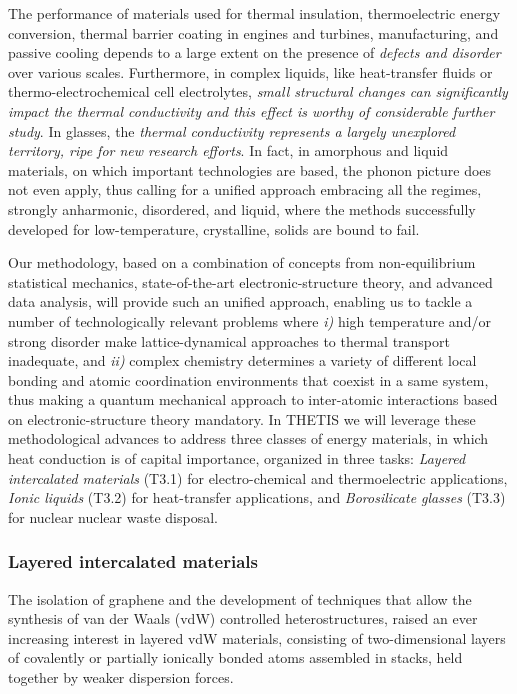 The performance of materials used for thermal insulation, thermoelectric energy conversion, thermal barrier coating in engines and turbines, manufacturing, and passive cooling depends to a large extent on the presence of \textit{defects and disorder} over various scales. Furthermore, in complex liquids, like heat-transfer fluids or thermo-electrochemical cell electrolytes, \textit{small structural changes can significantly impact the thermal conductivity and this effect is worthy of considerable further study}.\cite{MacFarlane:2014hj} In glasses, the \textit{thermal conductivity represents a largely unexplored territory, ripe for new research efforts}.\cite{MauroFM14} In fact, in amorphous and liquid materials, on which important technologies are based, the phonon picture does not even apply, thus calling for a unified approach embracing all the regimes, strongly anharmonic, disordered, and liquid, where the methods successfully developed for low-temperature, crystalline, solids are bound to fail.

Our methodology, based on a combination of concepts from non-equilibrium statistical mechanics, state-of-the-art electronic-structure theory, and advanced data analysis, will provide such an unified approach, enabling us to tackle a number of technologically relevant problems where \emph{i)} high temperature and/or strong disorder make lattice-dynamical approaches to thermal transport inadequate, and \emph{ii)} complex chemistry determines a variety of different local bonding and atomic coordination environments that coexist in a same system, thus making a quantum mechanical approach to inter-atomic interactions based on electronic-structure theory mandatory. In THETIS we will leverage these methodological advances to address three classes of energy materials, in which heat conduction is of capital importance, organized in three tasks: \emph{Layered intercalated materials} (T3.1) for electro-chemical and thermoelectric applications, \emph{Ionic liquids} (T3.2) for heat-transfer applications, and \emph{Borosilicate glasses} (T3.3) for nuclear nuclear waste disposal. 

\subsubsection{Layered intercalated materials}
The isolation of graphene and the development of techniques that allow the synthesis of van der Waals (vdW) controlled heterostructures, raised an ever increasing interest in layered vdW materials, consisting of two-dimensional layers of covalently or partially ionically bonded atoms assembled in stacks, held together by weaker dispersion forces.\cite{Geim:2014hf} 

